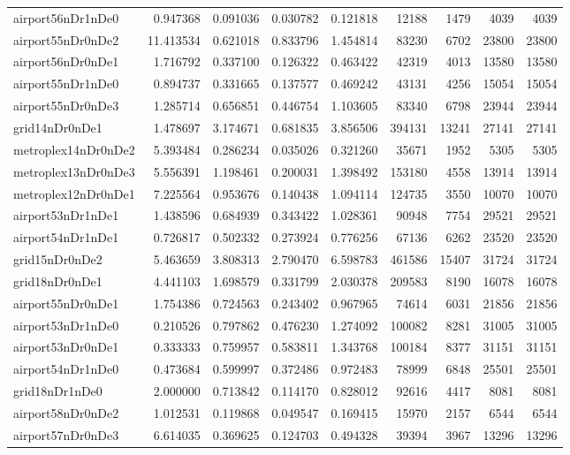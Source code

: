 \begin{longtable}{|l|r|r|r|r|r|r|r|r|}
airport56nDr1nDe0 & 0.947368 & 0.091036 & 0.030782 & 0.121818 & 12188 & 1479 & 4039 & 4039 \\
airport55nDr0nDe2 & 11.413534 & 0.621018 & 0.833796 & 1.454814 & 83230 & 6702 & 23800 & 23800 \\
airport56nDr0nDe1 & 1.716792 & 0.337100 & 0.126322 & 0.463422 & 42319 & 4013 & 13580 & 13580 \\
airport55nDr1nDe0 & 0.894737 & 0.331665 & 0.137577 & 0.469242 & 43131 & 4256 & 15054 & 15054 \\
airport55nDr0nDe3 & 1.285714 & 0.656851 & 0.446754 & 1.103605 & 83340 & 6798 & 23944 & 23944 \\
grid14nDr0nDe1 & 1.478697 & 3.174671 & 0.681835 & 3.856506 & 394131 & 13241 & 27141 & 27141 \\
metroplex14nDr0nDe2 & 5.393484 & 0.286234 & 0.035026 & 0.321260 & 35671 & 1952 & 5305 & 5305 \\
metroplex13nDr0nDe3 & 5.556391 & 1.198461 & 0.200031 & 1.398492 & 153180 & 4558 & 13914 & 13914 \\
metroplex12nDr0nDe1 & 7.225564 & 0.953676 & 0.140438 & 1.094114 & 124735 & 3550 & 10070 & 10070 \\
airport53nDr1nDe1 & 1.438596 & 0.684939 & 0.343422 & 1.028361 & 90948 & 7754 & 29521 & 29521 \\
airport54nDr1nDe1 & 0.726817 & 0.502332 & 0.273924 & 0.776256 & 67136 & 6262 & 23520 & 23520 \\
grid15nDr0nDe2 & 5.463659 & 3.808313 & 2.790470 & 6.598783 & 461586 & 15407 & 31724 & 31724 \\
grid18nDr0nDe1 & 4.441103 & 1.698579 & 0.331799 & 2.030378 & 209583 & 8190 & 16078 & 16078 \\
airport55nDr0nDe1 & 1.754386 & 0.724563 & 0.243402 & 0.967965 & 74614 & 6031 & 21856 & 21856 \\
airport53nDr1nDe0 & 0.210526 & 0.797862 & 0.476230 & 1.274092 & 100082 & 8281 & 31005 & 31005 \\
airport53nDr0nDe1 & 0.333333 & 0.759957 & 0.583811 & 1.343768 & 100184 & 8377 & 31151 & 31151 \\
airport54nDr1nDe0 & 0.473684 & 0.599997 & 0.372486 & 0.972483 & 78999 & 6848 & 25501 & 25501 \\
grid18nDr1nDe0 & 2.000000 & 0.713842 & 0.114170 & 0.828012 & 92616 & 4417 & 8081 & 8081 \\
airport58nDr0nDe2 & 1.012531 & 0.119868 & 0.049547 & 0.169415 & 15970 & 2157 & 6544 & 6544 \\
airport57nDr0nDe3 & 6.614035 & 0.369625 & 0.124703 & 0.494328 & 39394 & 3967 & 13296 & 13296 \\

\end{longtable}
